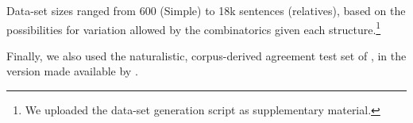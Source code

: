 Data-set sizes ranged from 600 (Simple) to 18k sentences (relatives),
based on the possibilities for variation allowed by the combinatorics
given each structure.\footnote{We uploaded the data-set generation
  script as supplementary material.}

Finally, we also used the naturalistic, corpus-derived agreement test set of , in the version made available by .






